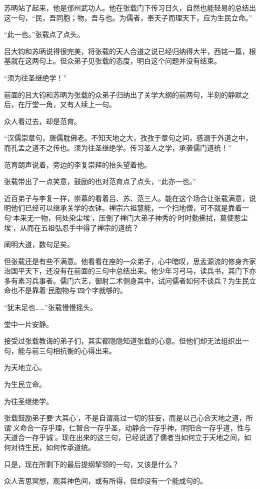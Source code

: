 苏昞站了起来，他是邠州武功人。他在张载门下传习日久，自然也能轻易的总结出这一句，“民，吾同胞；物，吾与也。为儒者，奉天子而理天下，应为生民立命。”

“此一也。”张载点了点头。

吕大钧和苏昞说得很完美，将张载的天人合道之说已经归纳得大半，西铭一篇，根基就在这两句上。但众弟子见张载的态度，明白这个问题并没有结束。

“须为往圣继绝学！”

前面的吕大钧和苏昞为张载的众弟子归纳出了关学大纲的前两句，半刻的静默之后，在厅堂一角，又有人续上一句。

众人看过去，却是范育。

“汉儒崇章句，唐儒耽佛老。不知天地之大，孜孜于章句之间，惑溺于外道之中，而孔孟之道不之传也。须为往圣继绝学。传习圣人之学，承袭儒门道统！”

范育朗声说着，旁边的李复崇拜的抬头望着他。

张载带出了一点笑意，鼓励的也对范育点了点头，“此亦一也。”

近百弟子与李复一样，崇慕的看着吕、苏、范三人。能在这个场合让张载满意，说明他们已经可以继承关学的衣钵。禅宗六祖慧能，一个扫地僧，可不就是靠着一句‘本来无一物，何处染尘埃’，压倒了禅门大弟子神秀的‘时时勤拂拭，莫使惹尘埃’，从而在五祖弘忍手中得了禅宗的道统？

阐明大道，数句足矣。

但张载还是有些不满意。他看看在座的一众弟子，心中暗叹，思孟源流的修身齐家治国平天下，还没有在前面的三句中总结出来。他少年习弓马，读兵书，其门下亦多有素习兵事者。儒门六艺，御射二术侧身其中，试问儒者如何不谈兵？为生民立命也不是靠着‘民胞物与’四个字就够的。

“犹未足也……”张载慢慢摇头。

堂中一片安静。

接受过张载教诲的弟子们，其实都隐隐知道张载的心意。但他们却无法组织出一句，能与前三句相抗衡的心得出来。

为天地立心。

为生民立命。

为往圣继绝学。

张载鼓励弟子要‘大其心’，不是自谓高过一切的狂妄，而是以己心合天地之道，所谓‘义命合一存乎理，仁智合一存乎圣，动静合一存乎神，阴阳合一存乎道，性与天道合一存乎诚’。现在出来的这三句，已经说透了儒者当如何立于天地之间，如何对待生民，如何传承道统。

只是，现在所剩下的最后提纲挈领的一句，又该是什么？

众人苦思冥想，观其神色间，或有所得，但却没有一个能成句的。

